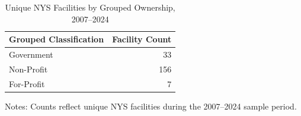 \documentclass{article}
\begin{document}
\begin{table}[htbp]\centering\caption{Unique NYS Facilities by Grouped Ownership, 2007--2024}\begin{threeparttable}
\begin{tabular}{lr}
\toprule
Grouped Classification & Facility Count \\
\midrule
Government & 33 \\
Non-Profit & 156 \\
For-Profit & 7 \\
\bottomrule
\end{tabular}
\begin{tablenotes}[flushleft]\footnotesize\item Notes: Counts reflect unique NYS facilities during the 2007--2024 sample period.\end{tablenotes}\end{threeparttable}\end{table}
\end{document}
